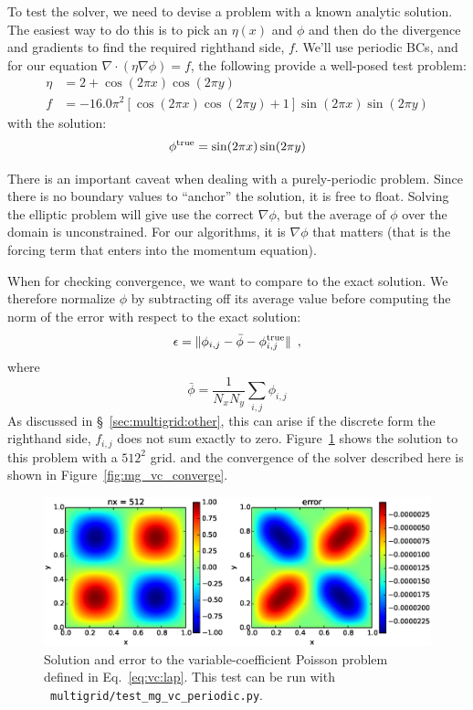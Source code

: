 To test the solver, we need to devise a problem with a known analytic
solution.  The easiest way to do this is to pick an $\eta(x)$ and
$\phi$ and then do the divergence and gradients to find the required
righthand side, $f$.  We'll use periodic BCs, and for our
equation $\nabla \cdot ( \eta \nabla \phi ) = f$, the following
provide a well-posed test problem:
\begin{align}
\eta &= 2 + \cos(2\pi x) \cos(2\pi y)  \label{eq:vc:lap}
\\
f &= -16.0 \pi^2 \left [ \cos(2\pi x)\cos(2\pi y) + 1 \right ] \sin(2\pi x)\sin(2 \pi y) \nonumber
\end{align}
with the solution:
\begin{equation}
\phi^\mathrm{true} = \sin(2 \pi x) \sin(2\pi y) \nonumber \\
\end{equation}

There is an important caveat when dealing with a purely-periodic
problem.  Since there is no boundary values to ``anchor'' the solution,
it is free to float.  Solving the elliptic problem will give use the
correct $\nabla \phi$, but the average of $\phi$ over the domain is 
unconstrained.  For our algorithms, it is $\nabla \phi$ that matters
(that is the forcing term that enters into the momentum equation).

When for checking convergence, we want to compare to the exact solution.
We therefore normalize $\phi$ by subtracting off its average value before
computing the norm of the error with respect to the exact solution:
\begin{equation}
\epsilon = \| \phi_{i,j} - \bar{\phi} - \phi^\mathrm{true}_{i,j} \| \enskip ,
\end{equation}
where
\begin{equation}
\bar{\phi} = \frac{1}{N_x N_y} \sum_{i,j} \phi_{i,j}
\end{equation}
As discussed in \S~\ref{sec:multigrid:other}, this can arise if
the discrete form the righthand side, $f_{i,j}$ does not sum exactly
to zero.  Figure~\ref{fig:mg_vc} shows the solution to this problem
with a $512^2$ grid. and the convergence of the solver described
here is shown in Figure~\ref{fig:mg_vc_converge}.

\begin{figure}[t]
\centering
\includegraphics[width=\linewidth]{mg_vc_periodic_test}
\caption[Solution and error of a variable-coefficient Poisson problem]{\label{fig:mg_vc} Solution and error to the variable-coefficient 
Poisson problem defined in Eq.~\ref{eq:vc:lap}.  This test can be
run with \pyro\ {\tt multigrid/test\_mg\_vc\_periodic.py}.}
\end{figure}


